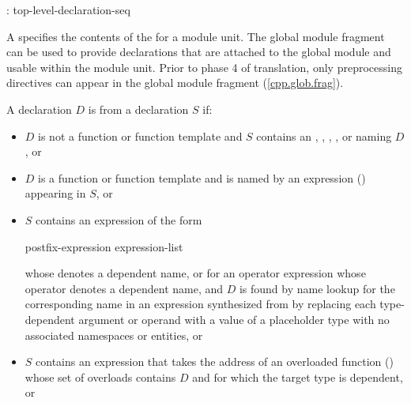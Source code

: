 \begin{std.txt}\color{addclr}
\begin{bnf}
:\br
     \terminal{;} top-level-declaration-seq\opt
\end{bnf}

\pnum
A  specifies the contents of the
 for a module unit.
The global module fragment can be used to provide declarations
that are attached to the global module and usable within the module unit.
\enternote
Prior to phase 4 of translation,
only preprocessing directives can appear
in the global module fragment (\ref{cpp.glob.frag}).
\exitnote

\pnum
A declaration $D$ is  from a declaration $S$ if:
\begin{itemize}
\item
$D$ is not a function or function template and
$S$ contains an
,
,
,
, or
naming $D$, or

\item
$D$ is a function or function template and
is named by an expression ()
appearing in $S$, or

\item
$S$ contains an expression  of the form

\begin{ncsimplebnf}
postfix-expression \terminal{(} expression-list\opt{} \terminal{)}
\end{ncsimplebnf}
whose  denotes a dependent name,
or for an operator expression whose operator denotes a dependent name,
and $D$ is found by name lookup for the corresponding name
in an expression synthesized from 
by replacing each type-dependent argument or operand
with a value of a placeholder type
with no associated namespaces or entities, or

\item
$S$ contains an expression that
takes the address of an overloaded function ()
whose set of overloads contains $D$ and
for which the target type is dependent, or


\end{itemize}
\end{std.txt}
